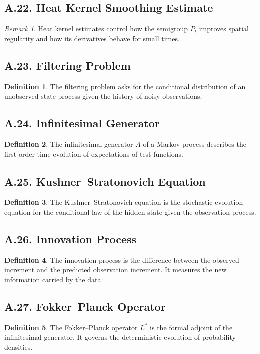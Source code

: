 \documentclass[11pt]{article}
\theoremstyle{definition}
\newtheorem{definition}{Definition}
\theoremstyle{remark}
\newtheorem{remark}{Remark}
\begin{document}
\subsection*{A.22. Heat Kernel Smoothing Estimate}
\begin{remark}
Heat kernel estimates control how the semigroup \(P_t\) improves spatial regularity and how its derivatives behave for small times.
\end{remark}

\subsection*{A.23. Filtering Problem}
\begin{definition}
The filtering problem asks for the conditional distribution of an unobserved state process given the history of noisy observations.
\end{definition}

\subsection*{A.24. Infinitesimal Generator}
\begin{definition}
The infinitesimal generator \(A\) of a Markov process describes the first-order time evolution of expectations of test functions.
\end{definition}

\subsection*{A.25. Kushner--Stratonovich Equation}
\begin{definition}
The Kushner--Stratonovich equation is the stochastic evolution equation for the conditional law of the hidden state given the observation process.
\end{definition}

\subsection*{A.26. Innovation Process}
\begin{definition}
The innovation process is the difference between the observed increment and the predicted observation increment. It measures the new information carried by the data.
\end{definition}

\subsection*{A.27. Fokker--Planck Operator}
\begin{definition}
The Fokker--Planck operator \(L^*\) is the formal adjoint of the infinitesimal generator. It governs the deterministic evolution of probability densities.
\end{definition}
\end{document}
